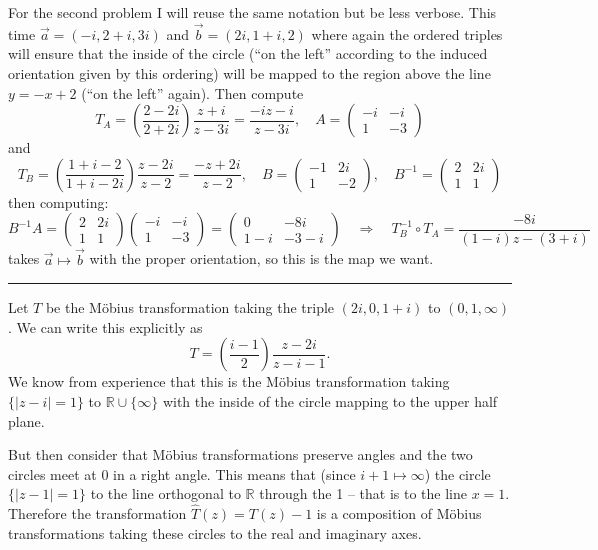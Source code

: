 \documentclass[12pt]{article}
\newcommand*{\R}{
\mathbb{R}
}
\newcommand*{\brk}{
\rule{2in}{.1pt}
}
\begin{document}
	For the second problem I will reuse the same notation but be less verbose. This time $\vec a=(-i,2+i,3i)$ and $\vec b=(2i,1+i,2)$ where again the ordered triples will ensure that the inside of the circle (``on the left'' according to the induced orientation given by this ordering) will be mapped to the region above the line $y=-x+2$ (``on the left'' again). Then compute
	\[T_A=\left(\frac{2-2i}{2+2i}\right)\frac{z+i}{z-3i}=\frac{-iz-i}{z-3i},\quad A=\begin{pmatrix}
		-i&-i\\1&-3
	\end{pmatrix}\]
	and
	\[T_B=\left(\frac{1+i-2}{1+i-2i}\right)\frac{z-2i}{z-2}=\frac{-z+2i}{z-2},\quad B=\begin{pmatrix}
		-1&2i\\1&-2
	\end{pmatrix},\quad B^{-1}=\begin{pmatrix}
	2&2i\\1&1
	\end{pmatrix}\]
	then computing:
	\[B^{-1}A=\begin{pmatrix}
	2&2i\\1&1
	\end{pmatrix}\begin{pmatrix}
	-i&-i\\1&-3
	\end{pmatrix}=\begin{pmatrix}
		0&-8i\\1-i&-3-i
	\end{pmatrix}\quad\Rightarrow\quad T_B^{-1}\circ T_A=\frac{-8i}{(1-i)z-(3+i)}\]
	takes $\vec a\mapsto\vec b$ with the proper orientation, so this is the map we want.
	
	\brk
	
	Let $T$ be the M\"obius transformation taking the triple $(2i,0,1+i)$ to $(0,1,\infty)$. We can write this explicitly as
	\[T=\left(\frac{i-1}{2}\right)\frac{z-2i}{z-i-1}.\]
	We know from experience that this is the M\"obius transformation taking $\{|z-i|= 1\}$ to $\R\cup\{\infty\}$ with the inside of the circle mapping to the upper half plane.
	
	But then consider that M\"obius transformations preserve angles and the two circles meet at 0 in a right angle. This means that (since $i+1\mapsto \infty$) the circle $\{|z-1|=1\}$ to the line orthogonal to $\R$ through the 1 -- that is to the line $x=1$. Therefore the transformation $\hat T(z)=T(z)-1$ is a composition of M\"obius transformations taking these circles to the real and imaginary axes.
	
\end{document}
